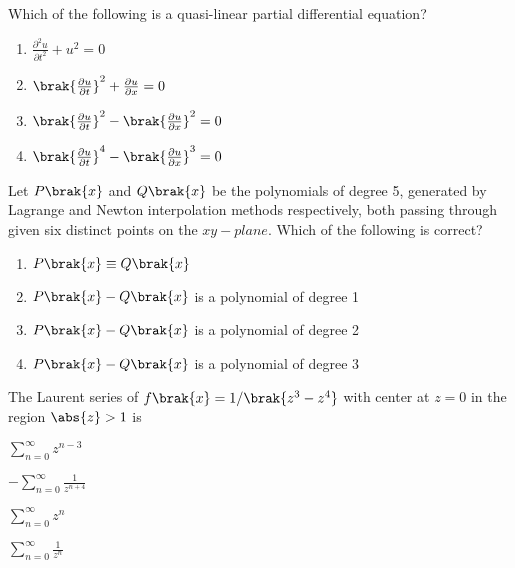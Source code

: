 \iffalse
\author{EE24BTECH11050}
\chapter{2016}
\section{xe}
\fi
\item %
Which of the following is a quasi-linear partial differential equation?
\begin{enumerate}
\item $ \frac{\partial ^2 u}{\partial t^2} + u^2 = 0$
\item $ \brak{\frac{\partial u}{\partial t}} ^2 + \frac{\partial u}{\partial x} =0$
\item $ \brak{\frac{\partial u}{\partial t}} ^2 - \brak{\frac{\partial u}{\partial x}} ^2 = 0$
\item $ \brak{\frac{\partial u}{\partial t}} ^4 - \brak{\frac{\partial u}{\partial x}} ^3 = 0$
\end{enumerate}
\item %
Let $P\brak{x}$ and $Q\brak{x}$ be the polynomials of degree 5, generated by Lagrange and Newton interpolation methods respectively, both passing through given six distinct points on the $xy-plane$. Which of the following is correct?
\begin{enumerate}
\item $P\brak{x}\equiv Q\brak{x}$
\item $P\brak{x} - Q\brak{x}$ is a polynomial of degree 1
\item $P\brak{x} - Q\brak{x}$ is a polynomial of degree 2
\item $P\brak{x} - Q\brak{x}$ is a polynomial of degree 3
\end{enumerate}
\item %
The Laurent series of $ f\brak{x}=1/\brak{z^3 - z^4} $ with center at $z=0$ in the region $\abs{z}>1$ is 
\begin{enumerate}
\begin{multicols}{4}
\item $ \sum\limits_{n=0}^{\infty} z^{n-3} $
\item $ - \sum\limits_{n=0}^{\infty} \frac{1}{z^{n+4}} $
\item $ \sum\limits_{n=0}^{\infty} z^{n} $
\item $ \sum\limits_{n=0}^{\infty} \frac{1}{z^n} $
\end{multicols}
\end{enumerate}
